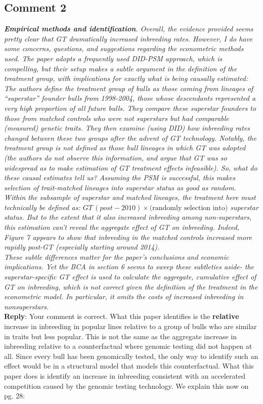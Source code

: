 \documentclass[12pt,letterpaper]{article}
\begin{document}
\subsection*{Comment 2}
{\it
\textbf{Empirical methods and identification}. Overall, the evidence provided seems pretty clear that GT dramatically increased inbreeding rates. However, I do have some concerns, questions, and suggestions regarding the econometric methods used. The paper adopts a frequently used DID-PSM approach, which is compelling, but their setup makes a subtle argument in the definition of the treatment group, with implications for exactly what is being causally estimated: The authors define
the treatment group of bulls as those coming from lineages of “superstar” founder
bulls from 1998-2004, those whose descendants represented a very high proportion
of all future bulls. They compare these superstar founders to those from matched
controls who were not superstars but had comparable (measured) genetic traits.
They then examine (using DID) how inbreeding rates changed between these two groups after the advent of GT technology. Notably, the treatment group is not defined as those bull lineages in which GT was adopted (the authors do not observe
this information, and argue that GT was so widespread as to make estimation of GT
treatment effects infeasible). So, what do these causal estimates tell us? Assuming
the PSM is successful, this makes selection of trait-matched lineages into superstar status as good as random. Within the subsample of superstar and matched
lineages, the treatment here must technically be defined as: $GT\,(post-2010) \times \text{(randomly selection into)}$ superstar status. But to the extent that it also increased inbreeding among non-superstars, this estimation can’t reveal the aggregate effect of GT on inbreeding. Indeed, Figure 7 appears to show that inbreeding in the matched controls increased more rapidly post-GT (especially starting around 2014). \\

These subtle differences matter for the paper’s conclusions and economic
implications. Yet the BCA in section 6 seems to sweep these subtleties aside- the
superstar-specific GT effect is used to calculate the aggregate, cumulative effect of GT on inbreeding, which is not correct given the definition of the treatment in the econometric model. In particular, it omits the costs of increased inbreeding in nonsuperstars.}\\ 

\textbf{Reply}: Your comment is correct. What this paper identifies is the \textbf{relative} increase in inbreeding in popular lines relative to a group of bulls who are similar in traits but less popular. This is not the same as the aggregate increase in inbreeding relative to a counterfactual where genomic testing did not happen at all. Since every bull has been genomically tested, the only way to identify such an effect would be in a structural model that models this counterfactual. What this paper does is identify an increase in inbreeding consistent with an accelerated competition caused by the genomic testing technology. We explain this now on pg. 28:
\end{document}

